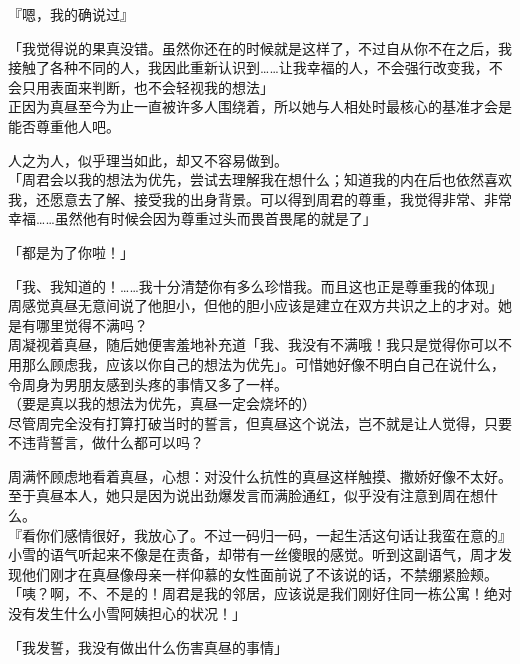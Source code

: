 『嗯，我的确说过』

「我觉得说的果真没错。虽然你还在的时候就是这样了，不过自从你不在之后，我接触了各种不同的人，我因此重新认识到……让我幸福的人，不会强行改变我，不会只用表面来判断，也不会轻视我的想法」\\

正因为真昼至今为止一直被许多人围绕着，所以她与人相处时最核心的基准才会是能否尊重他人吧。

人之为人，似乎理当如此，却又不容易做到。\\

「周君会以我的想法为优先，尝试去理解我在想什么；知道我的内在后也依然喜欢我，还愿意去了解、接受我的出身背景。可以得到周君的尊重，我觉得非常、非常幸福……虽然他有时候会因为尊重过头而畏首畏尾的就是了」

「都是为了你啦！」

「我、我知道的！……我十分清楚你有多么珍惜我。而且这也正是尊重我的体现」\\

周感觉真昼无意间说了他胆小，但他的胆小应该是建立在双方共识之上的才对。她是有哪里觉得不满吗？\\

周凝视着真昼，随后她便害羞地补充道「我、我没有不满哦！我只是觉得你可以不用那么顾虑我，应该以你自己的想法为优先」。可惜她好像不明白自己在说什么，令周身为男朋友感到头疼的事情又多了一样。\\

（要是真以我的想法为优先，真昼一定会烧坏的）\\

尽管周完全没有打算打破当时的誓言，但真昼这个说法，岂不就是让人觉得，只要不违背誓言，做什么都可以吗？

周满怀顾虑地看着真昼，心想：对没什么抗性的真昼这样触摸、撒娇好像不太好。至于真昼本人，她只是因为说出劲爆发言而满脸通红，似乎没有注意到周在想什么。\\

『看你们感情很好，我放心了。不过一码归一码，一起生活这句话让我蛮在意的』\\

小雪的语气听起来不像是在责备，却带有一丝傻眼的感觉。听到这副语气，周才发现他们刚才在真昼像母亲一样仰慕的女性面前说了不该说的话，不禁绷紧脸颊。\\

「咦？啊，不、不是的！周君是我的邻居，应该说是我们刚好住同一栋公寓！绝对没有发生什么小雪阿姨担心的状况！」

「我发誓，我没有做出什么伤害真昼的事情」\\

